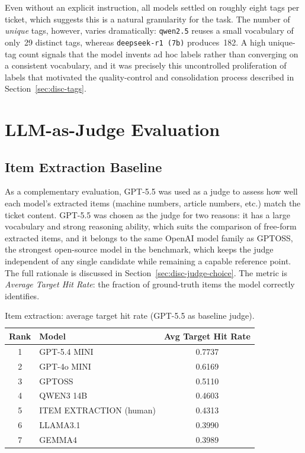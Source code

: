 Even without an explicit instruction, all models settled on roughly eight tags
per ticket, which suggests this is a natural granularity for the task.  The
number of \emph{unique} tags, however, varies dramatically: \texttt{qwen2.5}
reuses a small vocabulary of only~29 distinct tags, whereas
\texttt{deepseek-r1~(7b)} produces~182.  A high unique-tag count signals that
the model invents ad hoc labels rather than converging on a consistent
vocabulary, and it was precisely this uncontrolled proliferation of labels
that motivated the quality-control and consolidation process described in
Section~\ref{sec:disc-tags}.

\section{LLM-as-Judge Evaluation}
\label{sec:res-judge}
%
\subsection{Item Extraction Baseline}
\label{subsec:item-extraction-results}
%
As a complementary evaluation, GPT-5.5 was used as a judge to assess how
well each model's extracted items (machine numbers, article numbers, etc.)
match the ticket content.  GPT-5.5 was chosen as the judge for two reasons: it
has a large vocabulary and strong reasoning ability, which suits the comparison
of free-form extracted items, and it belongs to the same OpenAI model family as
GPTOSS, the strongest open-source model in the benchmark, which keeps the judge
independent of any single candidate while remaining a capable reference point.
The full rationale is discussed in Section~\ref{sec:disc-judge-choice}.  The
metric is \textit{Average Target Hit Rate}:
the fraction of ground-truth items the model correctly identifies.

\begin{table}[H]
    \centering
    \caption[Item extraction: average target hit rate]{Item extraction: average target hit rate (GPT-5.5 as baseline judge).}
    \label{tab:item-extraction-hitrate}
    \begin{tabular}{clc}
        \hline
        \textbf{Rank} & \textbf{Model} & \textbf{Avg Target Hit Rate} \\
        \hline
        1 & GPT-5.4 MINI    & 0.7737 \\
        2 & GPT-4o MINI     & 0.6169 \\
        3 & GPTOSS          & 0.5110 \\
        4 & QWEN3 14B       & 0.4603 \\
        5 & ITEM EXTRACTION (human) & 0.4313 \\
        6 & LLAMA3.1        & 0.3990 \\
        7 & GEMMA4          & 0.3989 \\
        \hline
    \end{tabular}
\end{table}

